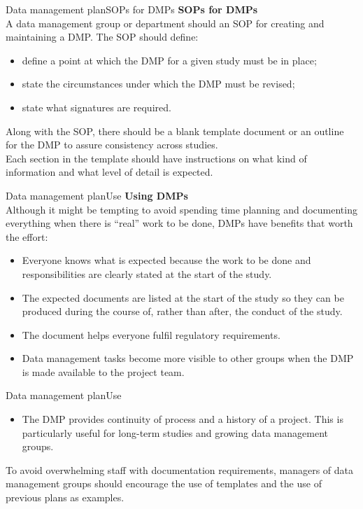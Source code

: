 \documentclass[xcolor=dvipsnames,11pt]{beamer}
\begin{document}
\begin{frame}[fragile]{Data management plan}{SOPs for DMPs}
	\textbf{SOPs for DMPs}\\
	\bigskip
	A data management group or department should an SOP for creating and maintaining a DMP. The SOP should define: 
	\begin{itemize}
		\item define a point at which the DMP for a given study must be in place;
		\item state the circumstances under which the DMP must be revised;
		\item state what signatures are required.
	\end{itemize}
	\bigskip
	Along with the SOP, there should be a blank template document or an outline for the DMP to assure consistency across studies.\\
	\bigskip
	Each section in the template should have instructions on what kind of information and what level of detail is expected.
\end{frame}

\begin{frame}[fragile]{Data management plan}{Use}
	\textbf{Using DMPs}\\
	\bigskip
	Although it might be tempting to avoid spending time planning and documenting everything when there is ``real'' work to be done, DMPs have benefits that worth the effort: 
	\begin{itemize}
		\item Everyone knows what is expected because the work to be done and responsibilities are clearly stated at the start of the study.
		\item The expected documents are listed at the start of the study so they can be produced during the course of, rather than after, the conduct of the study.
		\item The document helps everyone fulfil regulatory requirements.
		\item Data management tasks become more visible to other groups when the DMP is made available to the project team.
	\end{itemize}	
\end{frame}

\begin{frame}[fragile]{Data management plan}{Use}
	\begin{itemize}
		\item The DMP provides continuity of process and a history of a project. This is particularly useful for long-term studies and growing data management groups.
	\end{itemize}
	\bigskip
	To avoid overwhelming staff with documentation requirements, managers of data management groups should encourage the use of templates and the use of previous plans as examples.
\end{frame}
\end{document}
